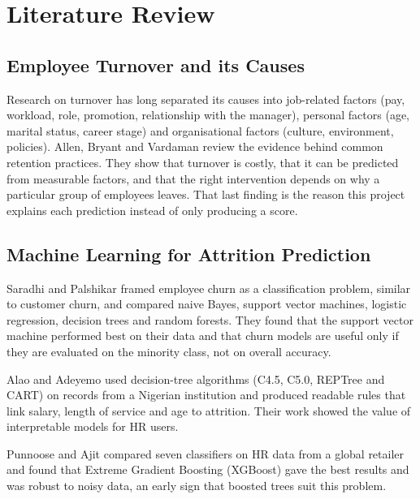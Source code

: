 \documentclass[12pt,a4paper]{report}
\begin{document}

\chapter{Literature Review}

\section{Employee Turnover and its Causes}

Research on turnover has long separated its causes into job-related factors (pay, workload, role, promotion, relationship with the manager), personal factors (age, marital status, career stage) and organisational factors (culture, environment, policies). Allen, Bryant and Vardaman \cite{allen2010retaining} review the evidence behind common retention practices. They show that turnover is costly, that it can be predicted from measurable factors, and that the right intervention depends on why a particular group of employees leaves. That last finding is the reason this project explains each prediction instead of only producing a score.

\section{Machine Learning for Attrition Prediction}

Saradhi and Palshikar \cite{saradhi2011employee} framed employee churn as a classification problem, similar to customer churn, and compared naive Bayes, support vector machines, logistic regression, decision trees and random forests. They found that the support vector machine performed best on their data and that churn models are useful only if they are evaluated on the minority class, not on overall accuracy.

Alao and Adeyemo \cite{alao2013analyzing} used decision-tree algorithms (C4.5, C5.0, REPTree and CART) on records from a Nigerian institution and produced readable rules that link salary, length of service and age to attrition. Their work showed the value of interpretable models for HR users.

Punnoose and Ajit \cite{punnoose2016prediction} compared seven classifiers on HR data from a global retailer and found that Extreme Gradient Boosting (XGBoost) gave the best results and was robust to noisy data, an early sign that boosted trees suit this problem.
\end{document}
